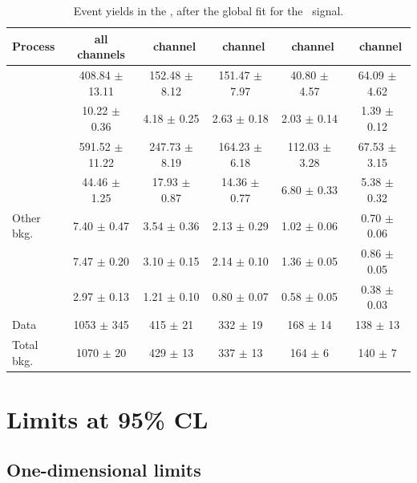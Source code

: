 \begin{landscape}
	\vspace*{\fill}
	\begin{table}[htbp]
		\centering
		\caption{Event yields  in the \WZCR, after the global fit for the \Zut\ signal.  }	
		\begin{tabular} {l c c c c c  }
			\toprule
			Process & all channels & \mumumu\ channel & \emumu\ channel & \eemu\ channel &\eee\ channel \\
			\midrule
			\NPL\ \DY  & 408.84 $ \pm $ 13.11 & 152.48 $\pm$ 8.12 &151.47 $\pm$ 7.97 & 40.80 $\pm$ 4.57 & 64.09 $\pm$ 4.62 \\ 
			\ttZ    	& 10.22 $ \pm $ 0.36  &  4.18 $\pm$  0.25 &  2.63 $\pm$ 0.18 &   2.03 $\pm$ 0.14 &  1.39 $\pm$ 0.12 \\ 
			\WZ 		& 591.52 $ \pm $ 11.22& 247.73 $\pm$ 8.19 &164.23 $\pm$ 6.18 & 112.03 $\pm$ 3.28 & 67.53 $\pm$ 3.15 \\ 
			\ZZ 		& 44.46 $ \pm $ 1.25  & 17.93 $\pm$  0.87 &14.36  $\pm$ 0.77 &   6.80 $\pm$ 0.33 & 5.38 $\pm$ 0.32 \\ 
			Other bkg. 	& 7.40 $ \pm $ 0.47   &  3.54 $\pm$  0.36 &  2.13 $\pm$ 0.29 &   1.02 $\pm$ 0.06 & 0.70 $\pm$ 0.06 \\ 
			\tZq 		& 7.47 $ \pm $ 0.20   &  3.10 $\pm$  0.15 &  2.14 $\pm$ 0.10 &   1.36 $\pm$ 0.05 & 0.86  $\pm$ 0.05 \B \\ 
			\kZut  		& 2.97 $ \pm $ 0.13   &  1.21 $\pm$  0.10 & 0.80 $\pm$ 0.07 &   0.58 $\pm$ 0.05 & 0.38 $\pm$ 0.03 \T\B\\
			\hdashline
			Data        & 1053 $ \pm $ 345 & 415 $\pm$ 21 & 332 $\pm$ 19 & 168 $\pm$ 14 & 138 $\pm$ 13 \T \\
			Total bkg.  & 1070 $ \pm $ 20 & 429 $\pm$ 13 & 337 $\pm$ 13 & 164 $\pm$ 6 & 140 $\pm$ 7 \\
			\bottomrule
		\end{tabular}
		\label{tab:PYieldWZCR}
	\end{table}
	\vspace*{\fill}
\end{landscape}
\newpage
\section{Limits at 95\% CL}
\label{sec:limits}
\subsection{One-dimensional limits}

